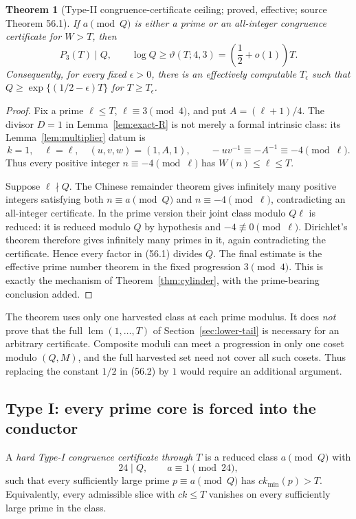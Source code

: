 \documentclass[10pt,reqno]{amsart}
\newtheorem{theorem}{Theorem}[section]
\theoremstyle{definition}
\newcommand{\lcm}{\operatorname {lcm}}
\newcommand{\1}{\mathbf 1}
\begin{document}
\begin{theorem}[Type-II congruence-certificate ceiling; proved, effective;
source Theorem 56.1]\label{thm:typeII-certificate}
If $a\pmod Q$ is either a prime or an all-integer congruence certificate for
$W>T$, then
\begin{equation}\tag{56.2}
 P_3(T)\mid Q,\qquad
 \log Q\geq\vartheta(T;4,3)=\left(\frac12+o(1)\right)T.
\end{equation}
Consequently, for every fixed $\epsilon>0$, there is an effectively
computable $T_\epsilon$ such that
$Q\geq\exp\{(1/2-\epsilon)T\}$ for $T\geq T_\epsilon$.
\end{theorem}
\begin{proof}
Fix a prime $\ell\leq T$, $\ell\equiv3\pmod4$, and put
$A=(\ell+1)/4$.  The divisor $D=1$ in
Lemma~\ref{lem:exact-R} is not merely a formal intrinsic class: its
Lemma~\ref{lem:multiplier} datum is
\begin{equation}\tag{56.3}
 k=1,\quad \ell=\ell,\quad (u,v,w)=(1,A,1),
 \qquad -uv^{-1}\equiv-A^{-1}\equiv-4\pmod\ell.
\end{equation}
Thus every positive integer $n\equiv-4\pmod\ell$ has
$W(n)\leq\ell\leq T$.

Suppose $\ell\nmid Q$.  The Chinese remainder theorem gives infinitely many
positive integers satisfying both $n\equiv a\pmod Q$ and
$n\equiv-4\pmod\ell$, contradicting an all-integer certificate.  In the
prime version their joint class modulo $Q\ell$ is reduced: it is reduced
modulo $Q$ by hypothesis and $-4\not\equiv0\pmod\ell$.  Dirichlet's theorem
therefore gives infinitely many primes in it, again contradicting the
certificate.  Hence every factor in (56.1) divides $Q$.  The final estimate
is the effective prime number theorem in the fixed progression
$3\pmod4$.  This is exactly the mechanism of Theorem~\ref{thm:cylinder},
with the prime-bearing conclusion added.
\end{proof}

The theorem uses only one harvested class at each prime modulus.  It does
\emph{not} prove that the full $\lcm(1,\ldots,T)$ of
Section~\ref{sec:lower-tail} is necessary for an arbitrary certificate.
Composite moduli can meet a progression in only one coset modulo $(Q,M)$,
and the full harvested set need not cover all such cosets.  Thus replacing
the constant $1/2$ in (56.2) by $1$ would require an additional argument.

\subsection{Type I: every prime core is forced into the conductor}
A \emph{hard Type-I congruence certificate through $T$} is a reduced class
$a\pmod Q$ with
\begin{equation}\tag{56.4}
                 24\mid Q,\qquad a\equiv1\pmod {24},
\end{equation}
such that every sufficiently large prime $p\equiv a\pmod Q$ has
$ck_{\min}(p)>T$.  Equivalently, every admissible slice with $ck\leq T$
vanishes on every sufficiently large prime in the class.
\end{document}
